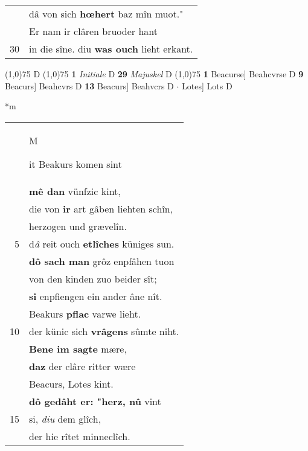 \documentclass[8pt,a4paper,notitlepage]{article}
\begin{document}
\begin{table}[ht]
\begin{minipage}[t]{0.5\linewidth}
\begin{tabular}{rl}
 & dâ von sich \textbf{hœhert} baz mîn muot."\\ 
 & Er nam ir clâren bruoder hant\\ 
30 & in die sîne. diu \textbf{was ouch} lieht erkant.\\ 
\end{tabular}
\scriptsize
\line(1,0){75} \newline
D \newline
\line(1,0){75} \newline
\textbf{1} \textit{Initiale} D  \textbf{29} \textit{Majuskel} D  \newline
\line(1,0){75} \newline
\textbf{1} Beacurse] Beahcvrse D \textbf{9} Beacurs] Beahcvrs D \textbf{13} Beacurs] Beahvcrs D  $\cdot$ Lotes] Lots D \newline
\end{minipage}
\hspace{0.5cm}
\begin{minipage}[t]{0.5\linewidth}
\small
\begin{center}*m
\end{center}
\begin{tabular}{rl}
 & \begin{large}M\end{large}it Beakurs komen sint\\ 
 & \textbf{mê dan} vünfzic kint,\\ 
 & die von \textbf{ir} art gâben liehten schîn,\\ 
 & herzogen und grævelîn.\\ 
5 & d\textit{â} reit ouch \textbf{etlîches} küniges sun.\\ 
 & \textbf{dô sach man} grôz enpfâhen tuon\\ 
 & von den kinden zuo beider sît;\\ 
 & \textbf{si} enpfiengen ein ander âne nît.\\ 
 & Beakurs \textbf{pflac} varwe lieht.\\ 
10 & der künic sich \textbf{vrâgens} sûmte niht.\\ 
 & \textbf{Bene im sagte} mære,\\ 
 & \textbf{daz} der clâre ritter wære\\ 
 & Beacurs, Lotes kint.\\ 
 & \textbf{dô gedâht er: "herz, nû} vint\\ 
15 & si, \textit{diu} dem glîch,\\ 
 & der hie rîtet minneclîch.\\ 

\end{tabular}
\end{minipage}
\end{table}
\end{document}
